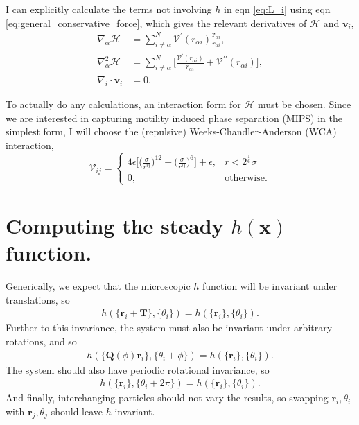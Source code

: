 \documentclass[twocolumn,amsmath,amssymb,aps]{revtex4-1}%
\begin{document}
I can explicitly calculate the terms not involving $h$ in eqn \ref{eq:L_i}
using eqn \ref{eq:general_conservative_force}, which gives the relevant
derivatives of $\mathcal{H}$ and $\bm{v}_i$,
\begin{subequations}
  \label{eqs:partials_of_L_i}
  \begin{align}
    \nabla_{\alpha}\mathcal{H}
    &=\sum_{i\neq\alpha}^N\mathcal{V}^{\prime}
    (r_{\alpha i})\frac{\bm{r}_{\alpha i}}{r_{\alpha i}},
    \label{eq:partial_H_of_L_i}\\
    \nabla_{\alpha}^2\mathcal{H}
    &=\sum_{i\neq\alpha}^N\bigg[\frac{\mathcal{V}^{\prime}
        (r_{\alpha i})}{r_{\alpha i}}
      +\mathcal{V}^{\prime\prime}(r_{\alpha i})\bigg],
    \label{eq:partialsq_H_of_L_i}\\
    \nabla_i\cdot \bm{v}_i
    &= 0.\label{eq:partial_v_of_L_i}
  \end{align}
\end{subequations}

To actually do any calculations, an interaction form for $\mathcal{H}$ must
be chosen. Since we are interested in capturing motility induced phase
separation (MIPS) in the simplest form, I will choose the (repulsive)
Weeks-Chandler-Anderson (WCA) interaction,
\begin{equation}\label{eq:WCAapprox}
  \mathcal{V}_{ij} =
  \begin{cases}
    4\epsilon\bigg[\bigg(\frac{\sigma}{r^{ij}}\bigg)^{12}
      -\bigg(\frac{\sigma}{r^{ij}}\bigg)^6\bigg]+\epsilon,
    & r<2^{\frac{1}{6}}\sigma \\
    0, & \mathrm{otherwise}.
  \end{cases}
\end{equation}

\section{Computing the steady $h(\bm{x})$ function.}

Generically, we expect that the microscopic $h$ function will be invariant
under translations, so
\begin{align}
  h(\{\bm{r}_i+\bm{T}\},\{\theta_i\}) = h(\{\bm{r}_i\},\{\theta_i\}).
\end{align}
Further to this invariance, the system must also be invariant
under arbitrary rotations, and so
\begin{align}
  h(\{\bm{Q}(\phi)\bm{r}_i\},\{\theta_i+\phi\})
  =h(\{\bm{r}_i\},\{\theta_i\}).
\end{align}
The system should also have periodic rotational invariance, so
\begin{align}
  h(\{\bm{r}_i\},\{\theta_i+2\pi\})
    =h(\{\bm{r}_i\},\{\theta_i\}).
\end{align}
And finally, interchanging particles should not vary the results, so swapping
$\bm{r}_i,\theta_i$ with $\bm{r}_j,\theta_j$ should leave $h$ invariant.
\end{document}
